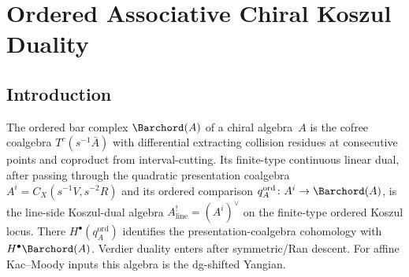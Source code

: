 
\providecommand{\Assch}{\mathrm{Ass}^{\mathrm{ch}}}
\providecommand{\Barch}{\overline{B}^{\mathrm{ch}}}
\providecommand{\Cobar}{\Omega^{\mathrm{ch}}}
\providecommand{\coHoch}{\operatorname{coHH}}
\providecommand{\SpCh}{\mathrm{Sp}^{\mathrm{ch}}}
\providecommand{\PhiFA}{\Phi^{\mathrm{FA}}}
\providecommand{\Cotor}{\operatorname{Cotor}}
\providecommand{\Coext}{\operatorname{Coext}}
\providecommand{\RHom}{R\!\operatorname{Hom}}
\providecommand{\Tot}{\operatorname{Tot}}
\providecommand{\KK}{\mathbb{K}}
\providecommand{\Dpbw}{D^{\mathrm{pbw}}}
\providecommand{\Dco}{D^{\mathrm{co}}}
\providecommand{\chotimes}{\mathbin{\otimes^{\mathrm{ch}}}}
\providecommand{\wt}{\widetilde}
\providecommand{\eps}{\varepsilon}
\providecommand{\susp}{s}
\providecommand{\coeq}{\operatorname{coeq}}
\providecommand{\id}{\mathrm{id}}
\providecommand{\op}{\mathrm{op}}
\providecommand{\cop}{\mathrm{cop}}
\providecommand{\HH}{\operatorname{HH}}
\providecommand{\Tor}{\operatorname{Tor}}
\providecommand{\Ext}{\operatorname{Ext}}
\providecommand{\gr}{\operatorname{gr}}
\providecommand{\MC}{\operatorname{MC}}
\providecommand{\Ob}{\operatorname{Ob}}
\providecommand{\eq}{\operatorname{eq}}
\providecommand{\Eone}{\mathsf{E}_1}
\providecommand{\Einf}{\mathsf{E}_{\infty}}
\providecommand{\Vlat}{V}
\providecommand{\barBgeom}{\bar{\mathbf{B}}}

\chapter{Ordered Associative Chiral Koszul Duality}
\label{ch:ordered-associative-chiral-kd}

\section{Introduction}

The ordered bar complex $\Barchord(A)$ of a chiral algebra~$A$
is the cofree coalgebra $T^c(s^{-1}\bar{A})$ with differential extracting
collision residues at consecutive points and coproduct from interval-cutting.
Its finite-type continuous linear dual, after passing through the
quadratic presentation coalgebra
$A^i=C_X(s^{-1}V,s^{-2}R)$ and its ordered comparison
$q_A^{\mathrm{ord}}\colon A^i\to\Barchord(A)$, is the line-side
Koszul-dual algebra $A^!_{\mathrm{line}}=(A^i)^\vee$ on the
finite-type ordered Koszul locus.  There
$H^\bullet(q_A^{\mathrm{ord}})$ identifies the presentation-coalgebra
cohomology with $H^\bullet\Barchord(A)$.  Verdier duality enters after
symmetric/Ran descent.
For affine Kac--Moody inputs this algebra is the dg-shifted Yangian.

